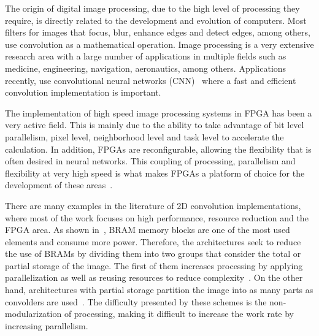 \documentclass[conference,compsoc]{IEEEtran}
\begin{document}




The origin of digital image processing, due to the high level of processing they
require, is directly related to the development and evolution of computers. Most
filters for images that focus, blur, enhance edges and detect edges, among
others, use convolution as a mathematical operation. Image processing is a very
extensive research area with a large number of applications in multiple fields
such as medicine, engineering, navigation, aeronautics, among others.
Applications recently, use convolutional neural networks
(CNN)~\cite{Lecun-et-al-1998} where a fast and efficient convolution
implementation is important.

The implementation of high speed image processing systems in FPGA has been a
very active field. This is mainly due to the ability to take advantage of bit
level parallelism, pixel level, neighborhood level and task level to accelerate
the calculation. In addition, FPGAs are reconfigurable, allowing the flexibility
that is often desired in neural networks. This coupling of processing,
parallelism and flexibility at very high speed is what makes FPGAs a platform of
choice for the development of these areas~\cite{papercnn}.

There are many examples in the literature of 2D convolution implementations,
where most of the work focuses on high performance, resource reduction and the
FPGA area. As shown in~\cite{paper3}, BRAM memory blocks are one of the most
used elements and consume more power. Therefore, the architectures seek to
reduce the use of BRAMs by dividing them into two groups that consider the total
or partial storage of the image. The first of them increases processing by
applying parallelization as well as reusing resources to reduce
complexity~\cite{paper1,paper5}. On the other hand, architectures with partial
storage partition the image into as many parts as convolders are
used~\cite{paper2,paper4}. The difficulty presented by these schemes is the
non-modularization of processing, making it difficult to increase the work rate
by increasing parallelism.
\end{document}
